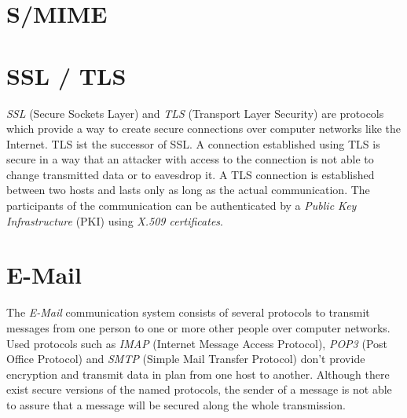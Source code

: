 \citep{RFC5280}



\section{S/MIME}

\citep{RFC5751}



\section{SSL / TLS}

\textit{SSL} (Secure Sockets Layer) and \textit{TLS} (Transport Layer Security) are protocols which provide a way to create secure connections over computer networks like the Internet.  TLS ist the successor of SSL. A connection established using TLS is secure in a way that an attacker with access to the connection is not able to change transmitted data or to eavesdrop it. \cite{RFC5246} A TLS connection is established between two hosts and lasts only as long as the actual communication. The participants of the communication can be authenticated by a \textit{Public Key Infrastructure} (PKI) using \textit{X.509 certificates}.

\section{E-Mail}

The \textit{E-Mail} communication system consists of several protocols to transmit messages from one person to one or more other people over computer networks. Used protocols such as \textit{IMAP} (Internet Message Access Protocol), \textit{POP3} (Post Office Protocol) and \textit{SMTP} (Simple Mail Transfer Protocol) don't provide encryption and transmit data in plan from one host to another. Although there exist secure versions of the named protocols, the sender of a message is not able to assure that a message will be secured along the whole transmission.  



